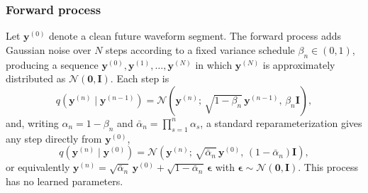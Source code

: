 \documentclass[lettersize,journal]{IEEEtran}
\begin{document}
\subsubsection{\textbf{Forward process}}
Let $\mathbf{y}^{(0)}$ denote a clean future waveform segment. The forward
process adds Gaussian noise over $N$ steps according to a fixed variance
schedule $\beta_n \in (0,1)$, producing a sequence
$\mathbf{y}^{(0)}, \mathbf{y}^{(1)}, \ldots, \mathbf{y}^{(N)}$ in which
$\mathbf{y}^{(N)}$ is approximately distributed as
$\mathcal{N}(\mathbf{0}, \mathbf{I})$. Each step is
\begin{equation}
q\!\left(\mathbf{y}^{(n)} \mid \mathbf{y}^{(n-1)}\right)
= \mathcal{N}\!\left(\mathbf{y}^{(n)};\, \sqrt{1-\beta_n}\,\mathbf{y}^{(n-1)},\,
\beta_n \mathbf{I}\right),
\label{eq:forward_step}
\end{equation}
and, writing $\alpha_n = 1-\beta_n$ and
$\bar{\alpha}_n = \prod_{s=1}^{n}\alpha_s$, a standard reparameterization
gives any step directly from $\mathbf{y}^{(0)}$,
\begin{equation}
q\!\left(\mathbf{y}^{(n)} \mid \mathbf{y}^{(0)}\right)
= \mathcal{N}\!\left(\mathbf{y}^{(n)};\, \sqrt{\bar{\alpha}_n}\,\mathbf{y}^{(0)},\,
(1-\bar{\alpha}_n)\mathbf{I}\right),
\label{eq:forward_marginal}
\end{equation}
or equivalently $\mathbf{y}^{(n)} = \sqrt{\bar{\alpha}_n}\,\mathbf{y}^{(0)}
+ \sqrt{1-\bar{\alpha}_n}\,\boldsymbol{\epsilon}$ with
$\boldsymbol{\epsilon} \sim \mathcal{N}(\mathbf{0},\mathbf{I})$. This process
has no learned parameters.
\end{document}

